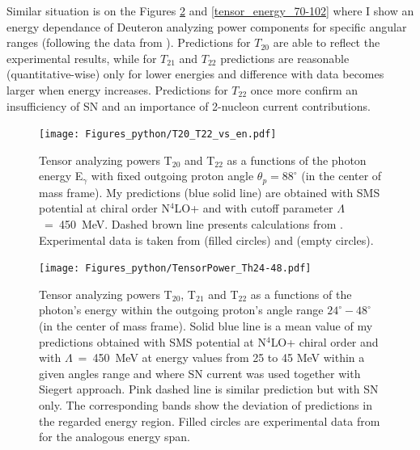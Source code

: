     Similar situation is on the Figures \ref{tensor_energy_24-48} and \ref{tensor_energy_70-102}
    where I show an energy dependance of Deuteron analyzing power components for 
    specific angular ranges (following the data from \cite{rachek2007}).
    Predictions for $T_{20}$ are able to reflect the experimental results,
    while for $T_{21}$ and $T_{22}$ predictions are reasonable (quantitative-wise) 
    only for lower energies and difference with data becomes larger
    when energy increases. Predictions for $T_{22}$ once more 
    confirm an insufficiency of SN and an importance of
    2-nucleon current contributions. 
    

    \begin{figure}[h]
        \begin{center}
        \texttt{[image: Figures\_python/T20\_T22\_vs\_en.pdf]}
        \end{center}
        \caption{Tensor analyzing powers T$_{20}$ and T$_{22}$ as a functions of the photon energy E$_\gamma$
        with fixed outgoing proton angle $\theta_p = 88^{\circ}$ (in the center of mass frame).
        My predictions (blue solid line) are obtained with SMS potential at chiral order N$^4$LO+
        and with cutoff parameter $\Lambda$~=~450~MeV.
        Dashed brown line presents calculations from \cite{Schmitt1989}.
        Experimental data is taken from \cite{rachek2007} (filled circles)
        and \cite{mishev1993} (empty circles).}
        \label{T20_vs_en}
    \end{figure}

    \begin{figure}[h]
        \begin{center}
        \texttt{[image: Figures\_python/TensorPower\_Th24-48.pdf]}
        \end{center}
        \caption{Tensor analyzing powers T$_{20}$, T$_{21}$ and T$_{22}$ as a functions of the
        photon's energy within the outgoing proton's angle range $24^{\circ} - 48^{\circ}$
        (in the center of mass frame).
        Solid blue line is a mean value of my predictions obtained with
        SMS potential at N$^4$LO+ chiral order and with $\Lambda$~=~450~MeV
        at energy values from 25 to 45 MeV within
        a given angles range and
        where SN current was used together with Siegert approach. 
        Pink dashed line is similar prediction but with SN only. 
        The corresponding bands show the deviation of predictions in the regarded
        energy region.
        Filled circles are experimental data
        from \cite{rachek2007} for the analogous energy span.}
        \label{tensor_energy_24-48}
    \end{figure}

